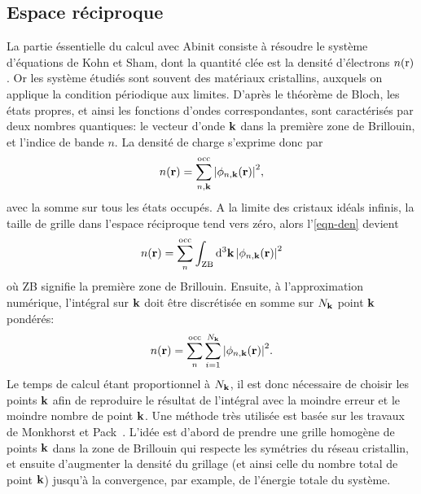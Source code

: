 \subsection{Espace réciproque}
\label{subsec-reciprocal}
La partie éssentielle du calcul avec Abinit consiste à résoudre le système d'équations de Kohn et Sham,
dont la quantité clée est la densité d'électrons $n(\textnormal{r})$.
Or les système étudiés sont souvent des matériaux cristallins,
auxquels on applique la condition périodique aux limites.
D'après le théorème de Bloch, les états propres, et ainsi les fonctions d'ondes correspondantes,
sont caractérisés par deux nombres quantiques:
le vecteur d'onde $\vb{k}$ dans la première zone de Brillouin, et l'indice de bande $n$.
La densité de charge s'exprime donc par
\begin{equation}
  \label{eqn-den}
  n(\vb{r}) = \sum_{n, \vb{k}}^{\textnormal{occ}}\abs{\phi_{n, \vb{k}}(\vb{r})}^2,
\end{equation}
avec la somme sur tous les états occupés.
A la limite des cristaux idéals infinis, la taille de grille dans l'espace réciproque tend vers zéro,
alors l'\cref{eqn-den} devient
\begin{equation*}
  n(\vb{r}) = \sum_n^{\textnormal{occ}}\int_{\textnormal{ZB}}\dd[3]{\vb{k}}\abs{\phi_{n, \vb{k}}(\vb{r})}^2
\end{equation*}
où ZB signifie la première zone de Brillouin. Ensuite, à l'approximation numérique,
l'intégral sur $\vb{k}$ doit être discrétisée en somme sur $N_{\vb{k}}$ point $\vb{k}$ pondérés:
\begin{equation*}
  n(\vb{r}) = \sum_n^{\textnormal{occ}}\sum_{i=1}^{N_{\vb{k}}}\abs{\phi_{n, \vb{k}}(\vb{r})}^2.
\end{equation*}
Le temps de calcul étant proportionnel à $N_{\vb{k}}$,
il est donc nécessaire de choisir les points $\vb{k}$ afin de reproduire le résultat
de l'intégral avec la moindre erreur et le moindre nombre de point $\vb{k}$.
Une méthode très utilisée est basée sur les travaux de Monkhorst et Pack~\cite{Monkhorst1976}.
L'idée est d'abord de prendre une grille homogène de points $\vb{k}$ dans la zone de Brillouin
qui respecte les symétries du réseau cristallin,
et ensuite d'augmenter la densité du grillage (et ainsi celle du nombre total de point $\vb{k}$)
jusqu'à la convergence, par example, de l'énergie totale du système.

